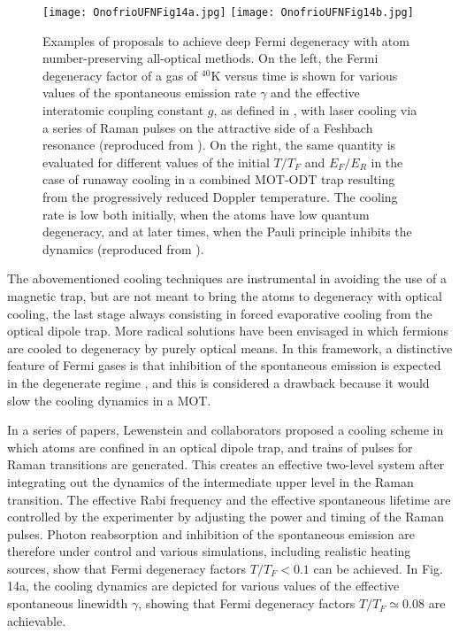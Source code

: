 \documentclass[pra,letterpaper,twocolumn,showpacs,superscriptaddress]{revtex4}
\begin{document}
\begin{figure*}[t]
\begin{center}
\texttt{[image: OnofrioUFNFig14a.jpg]}
\texttt{[image: OnofrioUFNFig14b.jpg]}
\end{center}
\caption{Examples of proposals to achieve deep Fermi degeneracy with atom number-preserving all-optical methods. 
On the left, the Fermi degeneracy factor of a gas of ${}^{40}$K versus time is shown for various values of the spontaneous emission 
rate $\gamma$ and the effective interatomic coupling constant $g$, as defined in \cite{Dziarmaga2005a}, with laser cooling 
via a series of Raman pulses on the attractive side of a Feshbach resonance (reproduced from \cite{Dziarmaga2005a}). 
On the right, the same quantity is evaluated for different values of the initial $T/T_F$ and $E_F/E_R$ in the case of runaway cooling 
in a combined MOT-ODT trap resulting from the progressively reduced Doppler temperature. The cooling rate is low both initially, when the 
atoms have low quantum degeneracy, and at later times, when the Pauli principle inhibits the dynamics (reproduced from \cite{Onofrio2016}).}
\end{figure*}

The abovementioned cooling techniques are instrumental in avoiding the use of a magnetic trap, but are not meant to bring the atoms to degeneracy 
with optical cooling, the last stage always consisting in forced evaporative cooling from the optical dipole trap. More radical solutions have been envisaged in 
which fermions are cooled to degeneracy by purely optical means. In this framework, a distinctive feature of Fermi gases is that inhibition of the spontaneous 
emission is expected in the degenerate regime \cite{Helmerson1990,Imamoglu1994,Javanainen1995,Busch1998,Gorlitz2001b,Shuve2010}, 
and this is considered a drawback because it would slow the cooling dynamics in a MOT. 

In a series of papers, Lewenstein and collaborators \cite{Idziaszek2001,Idziasek2002,Idziasek2003,Dziarmaga2005a,Dziarmaga2005b} proposed a cooling 
scheme in which atoms are confined in an optical dipole trap, and trains of pulses for Raman transitions  are generated. This creates an effective two-level 
system after integrating out the dynamics of the intermediate upper level in the Raman transition. The effective Rabi frequency and the effective 
spontaneous lifetime are controlled by the experimenter by adjusting the power and timing of the Raman pulses. Photon reabsorption and inhibition of the 
spontaneous emission are therefore under control and various simulations, including realistic heating sources, show that Fermi degeneracy factors $T/T_F < 0.1$ 
can be achieved. In Fig. 14a, the cooling dynamics are depicted for various values of the effective spontaneous linewidth $\gamma$, showing that 
Fermi degeneracy factors $T/T_F \simeq 0.08$ are achievable.  
\end{document}
